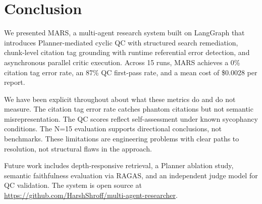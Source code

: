\documentclass[11pt]{article}
\begin{document}
\section{Conclusion}

We presented MARS, a multi-agent research system built on LangGraph that
introduces Planner-mediated cyclic QC with structured search remediation,
chunk-level citation tag grounding with runtime referential error detection, and
asynchronous parallel critic execution. Across 15 runs, MARS achieves a 0\%
citation tag error rate, an 87\% QC first-pass rate, and a mean cost of \$0.0028
per report.

We have been explicit throughout about what these metrics do and do not measure.
The citation tag error rate catches phantom citations but not semantic
misrepresentation. The QC scores reflect self-assessment under known sycophancy
conditions. The N=15 evaluation supports directional conclusions, not benchmarks.
These limitations are engineering problems with clear paths to resolution, not
structural flaws in the approach.

Future work includes depth-responsive retrieval, a Planner ablation study,
semantic faithfulness evaluation via RAGAS, and an independent judge model for
QC validation. The system is open source at
\url{https://github.com/HarshShroff/multi-agent-researcher}.



\end{document}
